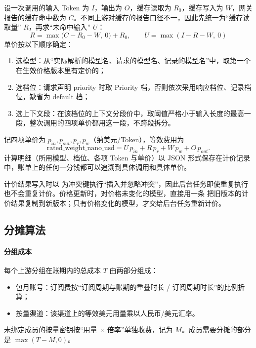 设一次调用的输入 Token 为 $I$，输出为 $O$，缓存读取为 $R_0$，缓存写入为 $W$，网关报告的缓存命中数为 $C$。不同上游对缓存的报告口径不一，因此先统一为“缓存读取量” $R$，再求“未命中输入” $U$：
\[
R = \max\bigl(C - R_0 - W,\ 0\bigr) + R_0,\qquad U = \max(I - R - W,\ 0)
\]
单价按以下顺序确定：
\begin{enumerate}
  \item 选模型：从“实际解析的模型名、请求的模型名、记录的模型名”中，取第一个在生效价格版本里有定价的；
  \item 选档位：请求声明 priority 时取 Priority 档，否则依次采用响应档位、记录档位，缺省为 default 档；
  \item 选上下文段：在该档位的上下文分段价中，取阈值严格小于输入长度的最高一段，整次调用的四项单价都用这一段，不跨段拆分。
\end{enumerate}
记四项单价为 $p_{in}, p_{out}, p_{r}, p_{w}$（纳美元/Token），等效费用为
\[
\text{rated\_weight\_nano\_usd} = U\,p_{in} + R\,p_{r} + W\,p_{w} + O\,p_{out}.
\]
计算明细（所用模型、档位、各项 Token 与单价）以 JSON 形式保存在计价记录中，账单上的任何一分钱都可以追溯到具体调用和具体单价。

计价结果写入时以  为冲突键执行“插入并忽略冲突”，因此后台任务即使重复执行也不会重复计价。价格更新时，对价格未变化的模型，直接用一条  把旧版本的计价结果复制到新版本；只有价格变化的模型，才交给后台任务重新计价。

\subsection{分摊算法}

\paragraph{分组成本}
每个上游分组在账期内的总成本 $T$ 由两部分组成：
\begin{itemize}
  \item 包月账号：订阅费按“订阅周期与账期的重叠时长 / 订阅周期时长”的比例折算；
  \item 按量渠道：该渠道上的等效美元用量乘以人民币/美元汇率。
\end{itemize}
未绑定成员的按量密钥按“用量 × 倍率”单独收费，记为 $M$。成员需要分摊的部分是 $\max(T-M, 0)$。

